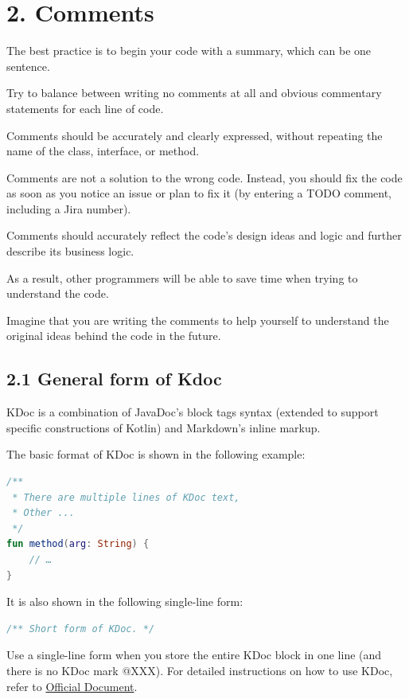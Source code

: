 \section*{\textbf{2. Comments}}

\label{sec:2.}



The best practice is to begin your code with a summary, which can be one sentence.

Try to balance between writing no comments at all and obvious commentary statements for each line of code.

Comments should be accurately and clearly expressed, without repeating the name of the class, interface, or method.

Comments are not a solution to the wrong code. Instead, you should fix the code as soon as you notice an issue or plan to fix it (by entering a TODO comment, including a Jira number).

Comments should accurately reflect the code's design ideas and logic and further describe its business logic.

As a result, other programmers will be able to save time when trying to understand the code.

Imagine that you are writing the comments to help yourself to understand the original ideas behind the code in the future. 



\subsection*{\textbf{2.1 General form of Kdoc}}

\label{sec:2.1}



KDoc is a combination of JavaDoc's block tags syntax (extended to support specific constructions of Kotlin) and Markdown's inline markup.

The basic format of KDoc is shown in the following example:



\begin{lstlisting}[language=Kotlin]
 /**
 * There are multiple lines of KDoc text,
 * Other ...
 */
fun method(arg: String) {
    // …
}
\end{lstlisting}


It is also shown in the following single-line form:



\begin{lstlisting}[language=Kotlin]
 /** Short form of KDoc. */
\end{lstlisting}
Use a single-line form when you store the entire KDoc block in one line (and there is no KDoc mark @XXX). For detailed instructions on how to use KDoc, refer to \href{https://docs.oracle.com/en/Kotlin/Kotlinse/11/tools/KDoc.html}{Official Document}.



